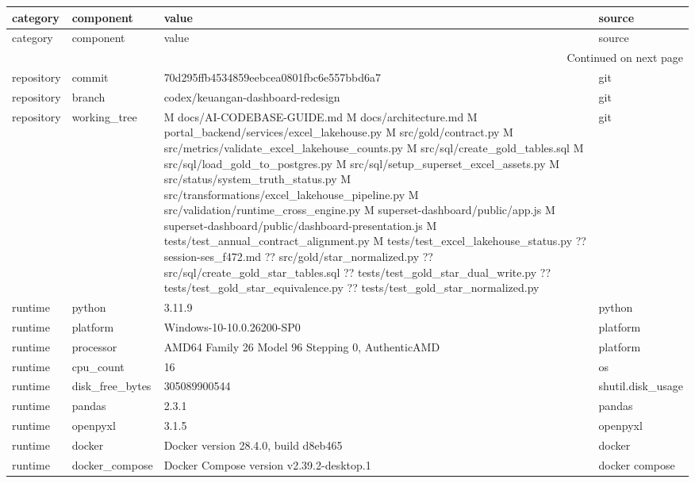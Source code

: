 \begingroup
\scriptsize
\begin{longtable}{llll}
\toprule
category & component & value & source \\
\midrule
\endfirsthead
\toprule
category & component & value & source \\
\midrule
\endhead
\midrule
\multicolumn{4}{r}{Continued on next page} \\
\midrule
\endfoot
\bottomrule
\endlastfoot
repository & commit & 70d295ffb4534859eebcea0801fbc6e557bbd6a7 & git \\
repository & branch & codex/keuangan-dashboard-redesign & git \\
repository & working_tree & M docs/AI-CODEBASE-GUIDE.md
 M docs/architecture.md
 M portal_backend/services/excel_lakehouse.py
 M src/gold/contract.py
 M src/metrics/validate_excel_lakehouse_counts.py
 M src/sql/create_gold_tables.sql
 M src/sql/load_gold_to_postgres.py
 M src/sql/setup_superset_excel_assets.py
 M src/status/system_truth_status.py
 M src/transformations/excel_lakehouse_pipeline.py
 M src/validation/runtime_cross_engine.py
 M superset-dashboard/public/app.js
 M superset-dashboard/public/dashboard-presentation.js
 M tests/test_annual_contract_alignment.py
 M tests/test_excel_lakehouse_status.py
?? session-ses_f472.md
?? src/gold/star_normalized.py
?? src/sql/create_gold_star_tables.sql
?? tests/test_gold_star_dual_write.py
?? tests/test_gold_star_equivalence.py
?? tests/test_gold_star_normalized.py & git \\
runtime & python & 3.11.9 & python \\
runtime & platform & Windows-10-10.0.26200-SP0 & platform \\
runtime & processor & AMD64 Family 26 Model 96 Stepping 0, AuthenticAMD & platform \\
runtime & cpu_count & 16 & os \\
runtime & disk_free_bytes & 305089900544 & shutil.disk_usage \\
runtime & pandas & 2.3.1 & pandas \\
runtime & openpyxl & 3.1.5 & openpyxl \\
runtime & docker & Docker version 28.4.0, build d8eb465 & docker \\
runtime & docker_compose & Docker Compose version v2.39.2-desktop.1 & docker compose \\
\end{longtable}
\endgroup
